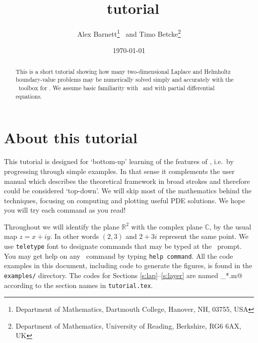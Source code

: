 \documentclass[11pt]{article}
\begin{document}
\title{\mpspack\ tutorial}
\author{Alex Barnett\footnote{Department of Mathematics, Dartmouth College,
Hanover, NH, 03755, USA}
\ and
Timo Betcke\footnote{Department of Mathematics,
University of Reading, Berkshire, RG6 6AX, UK}}
\date{\today}   %

\maketitle
\begin{abstract}
This is a short tutorial showing how many two-dimensional Laplace and Helmholtz
boundary-value problems
may be numerically solved simply and accurately with the \mpspack\ toolbox
for \matlab. We assume basic familiarity with \matlab\
and with partial differential equations.
\end{abstract}


\section{About this tutorial}

This tutorial is designed for `bottom-up' learning of the features
of \mpspack, i.e.\ by progressing through simple examples.
In that sense it complements the user manual which describes
the theoretical framework in broad strokes and therefore could
be considered `top-down'.
We will skip most of the mathematics behind the techniques,
focusing on computing and plotting useful PDE solutions.
We hope you will try each command as you read!

Throughout we will identify the plane $\mathbb{R}^2$ with the complex
plane $\mathbb{C}$, by the usual map $z=x+iy$. In other words
$(2,3)$ and $2+3i$ represent the same point.
We use {\tt teletype} font to designate commands that may be typed
at the \matlab\ prompt.
You may get help on any \mpspack\ command by typing {\tt help command}.
All the code examples in this document, including code to generate the
figures, is found in the {\tt examples/} directory.
The codes for Sections \ref{s:lap}--\ref{s:layer} are named
\verb@tut_*.m@ according to the section names in {\tt tutorial.tex}.









 

\end{document}
